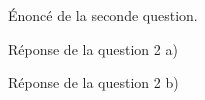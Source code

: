 
\begin{Question}
    Énoncé de la seconde question.   
\end{Question}

\begin{Answer}
    Réponse de la question 2 a)
\end{Answer}

\begin{Answer} 
    Réponse de la question 2 b)
\end{Answer}


